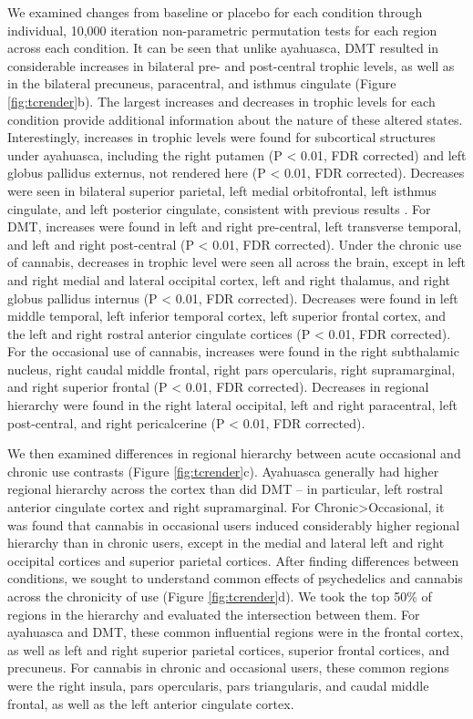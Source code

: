 We examined changes from baseline or placebo for each condition 
through individual, 10,000 iteration non-parametric permutation 
tests for each region across each condition. It can be seen 
that unlike ayahuasca, DMT resulted in considerable increases in 
bilateral pre- and post-central trophic levels, as well as in 
the bilateral precuneus, paracentral, and isthmus cingulate 
(Figure \ref{fig:tcrender}b). The largest increases 
and decreases in trophic levels for each condition provide 
additional information about the nature of these altered 
states. Interestingly, increases in trophic levels were found 
for subcortical structures under ayahuasca, including the right 
putamen (P < 0.01, FDR corrected) and left globus pallidus externus, not rendered here (P 
< 0.01, FDR corrected). Decreases were seen in 
bilateral superior parietal, left medial orbitofrontal, left 
isthmus cingulate, and left posterior cingulate, consistent 
with previous results \parencite{Timmermann2019,Carhart-Harris2016}. For DMT, increases were found in left and right 
pre-central, left transverse temporal, and left and right post-central (P < 0.01, FDR corrected). Under the chronic 
use of cannabis, decreases in trophic level were seen all 
across the brain, except in left and right medial and lateral 
occipital cortex, left and right thalamus, and right globus 
pallidus internus (P < 0.01, FDR corrected). Decreases 
were found in left middle temporal, left inferior temporal 
cortex, left superior frontal cortex, and the left and right 
rostral anterior cingulate cortices (P < 0.01, FDR 
corrected). For the occasional use of cannabis, increases were 
found in the right subthalamic nucleus, right caudal middle 
frontal, right pars opercularis, right supramarginal, and right 
superior frontal (P < 0.01, FDR corrected). Decreases 
in regional hierarchy were found in the right lateral 
occipital, left and right paracentral, left post-central, and 
right pericalcerine (P < 0.01, FDR corrected). 

We then examined differences in regional hierarchy between acute occasional and chronic use contrasts (Figure \ref{fig:tcrender}c). Ayahuasca generally had higher regional hierarchy across the cortex than did DMT -- in particular, left rostral anterior cingulate cortex and right supramarginal. For Chronic>Occasional, it was found that cannabis in occasional users induced considerably higher regional hierarchy than in chronic users, except in the medial and lateral left and right occipital cortices and superior parietal cortices. After finding differences between conditions, we sought to understand common effects of psychedelics and cannabis across the chronicity of use (Figure \ref{fig:tcrender}d). We took the top 50\% of regions in the hierarchy and evaluated the intersection between them. For ayahuasca and DMT, these common influential regions were in the frontal cortex, as well as left and right superior parietal cortices, superior frontal cortices, and precuneus. For cannabis in chronic and occasional users, these common regions were the right insula, pars opercularis, pars triangularis, and caudal middle frontal, as well as the left anterior cingulate cortex.

